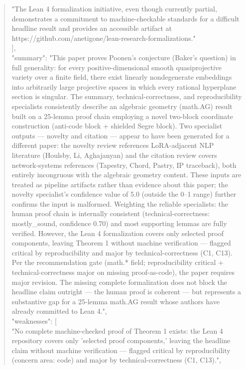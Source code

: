 \documentclass[11pt]{article}
\begin{document}
\begin{quote}
    "The Lean 4 formalization initiative, even though currently partial, demonstrates a commitment to machine-checkable standards for a difficult headline result and provides an accessible artifact at https://github.com/anetigone/lean-research-formalizations."\\
  ],\\
  "summary": "This paper proves Poonen's conjecture (Baker's question) in full generality: for every positive-dimensional smooth quasiprojective variety over a finite field, there exist linearly nondegenerate embeddings into arbitrarily large projective spaces in which every rational hyperplane section is singular. The summary, technical-correctness, and reproducibility specialists consistently describe an algebraic geometry (math.AG) result built on a 25-lemma proof chain employing a novel two-block coordinate construction (anti-code block + shielded Segre block). Two specialist outputs --- novelty and citation --- appear to have been generated for a different paper: the novelty review references LoRA-adjacent NLP literature (Houlsby, Li, Aghajanyan) and the citation review covers network-systems references (Tapestry, Chord, Pastry, IP traceback), both entirely incongruous with the algebraic geometry content. These inputs are treated as pipeline artifacts rather than evidence about this paper; the novelty specialist's confidence value of 5.0 (outside the 0--1 range) further confirms the input is malformed. Weighting the reliable specialists: the human proof chain is internally consistent (technical-correctness: mostly\_sound, confidence 0.70) and most supporting lemmas are fully verified. However, the Lean 4 formalization covers only selected proof components, leaving Theorem 1 without machine verification --- flagged critical by reproducibility and major by technical-correctness (C1, C13). Per the recommendation gate (math.* field; reproducibility critical + technical-correctness major on missing proof-as-code), the paper requires major revision. The missing complete formalization does not block the headline claim outright --- the human proof is coherent --- but represents a substantive gap for a 25-lemma math.AG result whose authors have already committed to Lean 4.",\\
  "weaknesses": [\\
    "No complete machine-checked proof of Theorem 1 exists: the Lean 4 repository covers only 'selected proof components,' leaving the headline claim without machine verification --- flagged critical by reproducibility (concern area: code) and major by technical-correctness (C1, C13).",\\

\end{quote}
\end{document}
